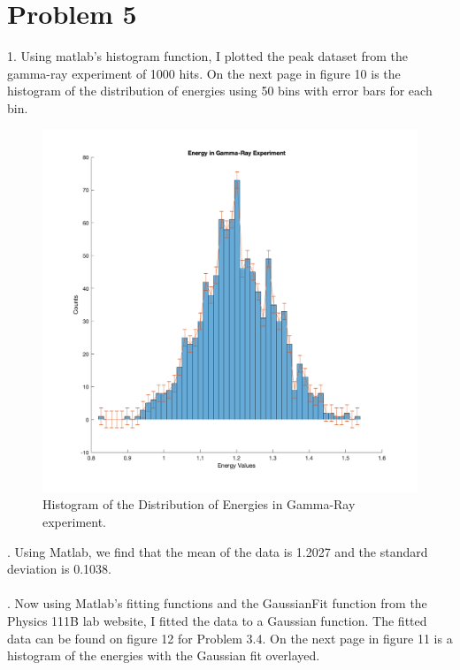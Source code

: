 \documentclass{article}
\begin{document}
\section*{Problem 5} 
1. Using matlab's histogram function, I plotted the peak dataset from the gamma-ray experiment of 1000 hits. On the next page in figure 10 is the histogram of the distribution of energies using 50 bins with error bars for each bin.
   \begin{figure}[H]
  \centering
  \includegraphics[width=0.8\linewidth]{lateximages/Prob5_1.png}
  \caption{Histogram of the Distribution of Energies in Gamma-Ray experiment.}
  \label{fig:boat2}
  \end{figure}  
  
 
. Using Matlab, we find that the mean of the data is 1.2027 and the standard deviation is 0.1038.
\\ \\
. Now using Matlab's fitting functions and the GaussianFit function from the Physics 111B lab website, I fitted the data to a Gaussian function. The fitted data can be found on figure 12 for Problem 3.4. On the next page in figure 11 is a histogram of the energies with the Gaussian fit overlayed.
\end{document}
